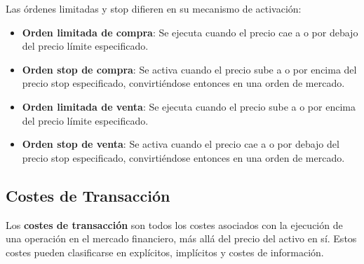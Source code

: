 \begin{proposicion}
Las órdenes limitadas y stop difieren en su mecanismo de activación:
\begin{itemize}
\item \textbf{Orden limitada de compra}: Se ejecuta cuando el precio cae a o por debajo del precio límite especificado.
\item \textbf{Orden stop de compra}: Se activa cuando el precio sube a o por encima del precio stop especificado, convirtiéndose entonces en una orden de mercado.
\item \textbf{Orden limitada de venta}: Se ejecuta cuando el precio sube a o por encima del precio límite especificado.
\item \textbf{Orden stop de venta}: Se activa cuando el precio cae a o por debajo del precio stop especificado, convirtiéndose entonces en una orden de mercado.
\end{itemize}
\end{proposicion}

\subsection{Costes de Transacción}

\begin{definicion}
Los \textbf{costes de transacción} son todos los costes asociados con la ejecución de una operación en el mercado financiero, más allá del precio del activo en sí. Estos costes pueden clasificarse en explícitos, implícitos y costes de información.
\end{definicion}

